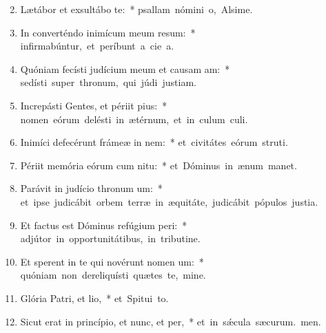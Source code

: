 \begin{flushleft}
\begin{enumerate}[leftmargin=*]
\setcounter{enumi}{1}

\item Lætábor et exsultábo  te:~* \mbox{psallam nómini o, Alsime.}

\item In converténdo inimícum meum resum:~* \mbox{infirmabúntur, et períbunt a cie a.}

\item Quóniam fecísti judícium meum et causam am:~* \mbox{sedísti super thronum, qui júdi justiam.}

\item Increpásti Gentes, et périit pius:~* \mbox{nomen eórum delésti in ætérnum, et in culum culi.}

\item Inimíci defecérunt frámeæ in nem:~* \mbox{et civitátes eórum struti.}

\item Périit memória eórum cum nitu:~* \mbox{et Dóminus in ænum manet.}

\item Parávit in judício thronum um:~* \mbox{et ipse judicábit orbem terræ in æquitáte, judicábit pópulos  justia.}

\item Et factus est Dóminus refúgium peri:~* \mbox{adjútor in opportunitátibus, in tributine.}

\item Et sperent in te qui novérunt nomen um:~* \mbox{quóniam non dereliquísti quætes te, mine.}

\item Glória Patri, et lio,~* \mbox{et Spitui to.}

\item Sicut erat in princípio, et nunc, et per,~* \mbox{et in s\'{\ae}cula sæcurum. men.}

\end{enumerate}
\end{flushleft}

